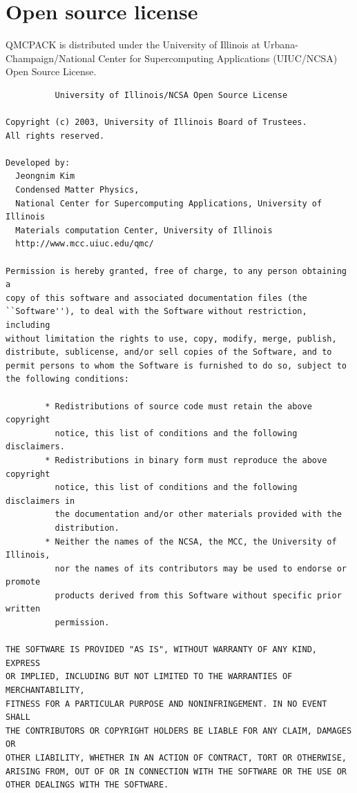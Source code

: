 \section{Open source license}
\label{sec:license}

QMCPACK is distributed under the University of Illinois at
Urbana-Champaign/National Center for Supercomputing Applications (UIUC/NCSA) Open
Source License. 

\begin{verbatim}
		  University of Illinois/NCSA Open Source License

Copyright (c) 2003, University of Illinois Board of Trustees.
All rights reserved.

Developed by:   
  Jeongnim Kim
  Condensed Matter Physics,
  National Center for Supercomputing Applications, University of Illinois
  Materials computation Center, University of Illinois
  http://www.mcc.uiuc.edu/qmc/

Permission is hereby granted, free of charge, to any person obtaining a
copy of this software and associated documentation files (the
``Software''), to deal with the Software without restriction, including
without limitation the rights to use, copy, modify, merge, publish,
distribute, sublicense, and/or sell copies of the Software, and to
permit persons to whom the Software is furnished to do so, subject to
the following conditions:

        * Redistributions of source code must retain the above copyright 
          notice, this list of conditions and the following disclaimers.
        * Redistributions in binary form must reproduce the above copyright 
          notice, this list of conditions and the following disclaimers in 
          the documentation and/or other materials provided with the 
          distribution.
        * Neither the names of the NCSA, the MCC, the University of Illinois, 
          nor the names of its contributors may be used to endorse or promote 
          products derived from this Software without specific prior written 
          permission.

THE SOFTWARE IS PROVIDED "AS IS", WITHOUT WARRANTY OF ANY KIND, EXPRESS
OR IMPLIED, INCLUDING BUT NOT LIMITED TO THE WARRANTIES OF MERCHANTABILITY, 
FITNESS FOR A PARTICULAR PURPOSE AND NONINFRINGEMENT. IN NO EVENT SHALL 
THE CONTRIBUTORS OR COPYRIGHT HOLDERS BE LIABLE FOR ANY CLAIM, DAMAGES OR 
OTHER LIABILITY, WHETHER IN AN ACTION OF CONTRACT, TORT OR OTHERWISE, 
ARISING FROM, OUT OF OR IN CONNECTION WITH THE SOFTWARE OR THE USE OR 
OTHER DEALINGS WITH THE SOFTWARE.
\end{verbatim}

